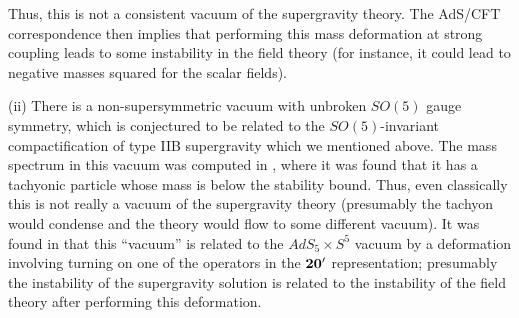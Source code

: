 \begin{itemize}
Thus, this is not a consistent
 vacuum of the supergravity theory. The AdS/CFT correspondence then
 implies that performing this mass deformation at strong coupling
 leads to some instability in the field theory (for instance, it could
 lead to negative masses squared for the scalar fields).

 (ii) There is a non-supersymmetric vacuum with unbroken $SO(5)$ gauge
 symmetry, which is conjectured to be related to the $SO(5)$-invariant
 compactification of type IIB supergravity which we mentioned
 above. The mass spectrum in this vacuum was computed in
 \cite{Distler:1998gb}, where it was found that it has a tachyonic
 particle whose mass is below the stability bound. Thus, even
 classically this is not really a vacuum of the supergravity theory
 (presumably the tachyon would condense and the theory would flow to
 some different vacuum). It was found in
 \cite{Girardello:1998pd,Distler:1998gb} that this ``vacuum'' is
 related to the $AdS_5\times S^5$ vacuum by a deformation involving
 turning on one of the operators in the $\bf{20'}$ representation;
 presumably the instability of the supergravity solution is related to
 the instability of the field theory after performing this
 deformation.


\end{itemize}
